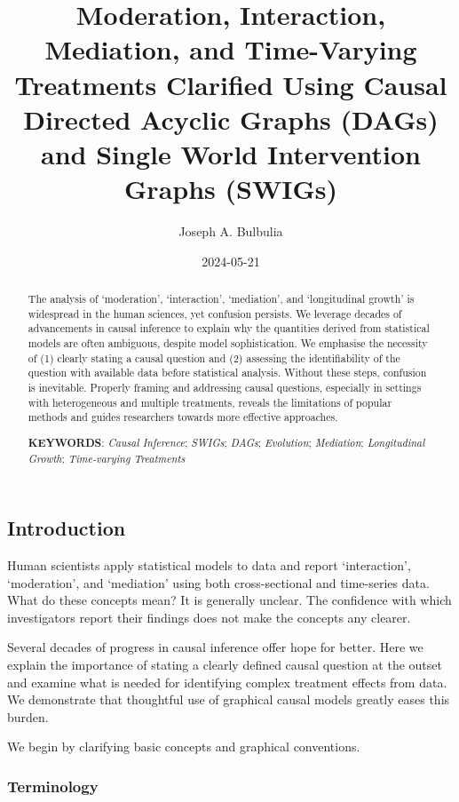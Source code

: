 \documentclass[
  single column]{article}
\title{Moderation, Interaction, Mediation, and Time-Varying Treatments
Clarified Using Causal Directed Acyclic Graphs (DAGs) and Single World
Intervention Graphs (SWIGs)}
\author{Joseph A. Bulbulia}
\affil{%
             \small{     Victoria University of Wellington, New Zealand
          ORCID \textcolor[HTML]{A6CE39}{\aiOrcid} ~0000-0002-5861-2056 }
              }
\date{2024-05-21}
\begin{document}
\maketitle
\begin{abstract}
The analysis of `moderation', `interaction', `mediation', and
`longitudinal growth' is widespread in the human sciences, yet confusion
persists. We leverage decades of advancements in causal inference to
explain why the quantities derived from statistical models are often
ambiguous, despite model sophistication. We emphasise the necessity of
(1) clearly stating a causal question and (2) assessing the
identifiability of the question with available data before statistical
analysis. Without these steps, confusion is inevitable. Properly framing
and addressing causal questions, especially in settings with
heterogeneous and multiple treatments, reveals the limitations of
popular methods and guides researchers towards more effective
approaches.

\textbf{KEYWORDS}: \emph{Causal Inference}; \emph{SWIGs}; \emph{DAGs};
\emph{Evolution}; \emph{Mediation}; \emph{Longitudinal Growth};
\emph{Time-varying Treatments}
\end{abstract}

\subsection{Introduction}\label{introduction}

Human scientists apply statistical models to data and report
`interaction', `moderation', and `mediation' using both cross-sectional
and time-series data. What do these concepts mean? It is generally
unclear. The confidence with which investigators report their findings
does not make the concepts any clearer.

Several decades of progress in causal inference offer hope for better.
Here we explain the importance of stating a clearly defined causal
question at the outset and examine what is needed for identifying
complex treatment effects from data. We demonstrate that thoughtful use
of graphical causal models greatly eases this burden.

We begin by clarifying basic concepts and graphical conventions.

\subsubsection{Terminology}\label{terminology}
\end{document}
